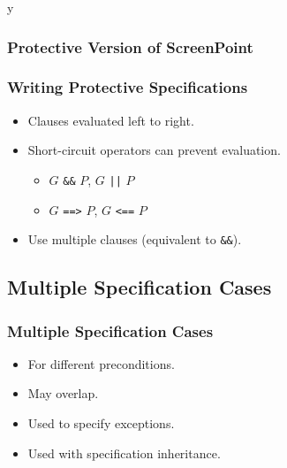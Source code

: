 \if y\MAKEHANDOUTS \documentclass[t,compress,landscape,handout]{beamer}
\begin{document}
\begin{frame}
\frametitle{Protective Version of ScreenPoint}

\end{frame}

\begin{frame}[fragile]
\frametitle{Writing Protective Specifications}

\begin{itemize}
\item
Clauses evaluated left to right.

\item
Short-circuit operators can prevent evaluation.
\begin{itemize}
\item
$G$ \lstinline!&&! $P$, $G$ \lstinline!||! $P$

\item
$G$ \lstinline!==>! $P$, $G$ \lstinline!<==! $P$
\end{itemize}

\item
Use multiple clauses (equivalent to \lstinline!&&!).
\end{itemize}
\end{frame}


\subsection[Spec Cases]{Multiple Specification Cases}

\begin{frame}
\frametitle{Multiple Specification Cases}

\begin{itemize}
\item
For different preconditions.

\item
May overlap.

\item
Used to specify exceptions.

\item
Used with specification inheritance.
\end{itemize}
\end{frame}
\end{document}
